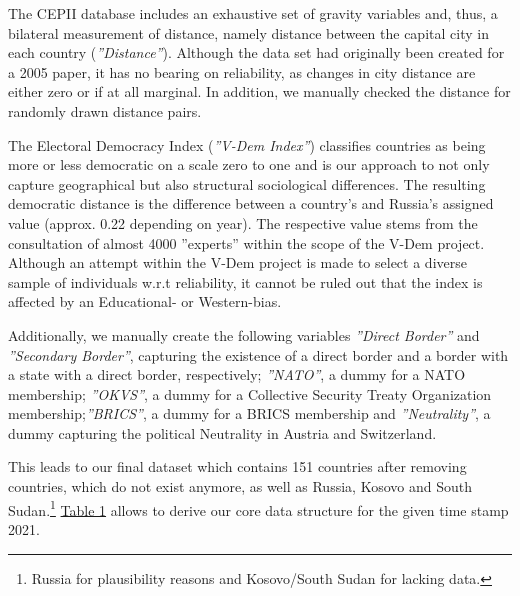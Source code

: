 \documentclass[12pt,a4paper]{article}
\begin{document}
\pagebreak
The CEPII database includes an exhaustive set of gravity variables and, thus, a bilateral measurement of distance, namely distance between the capital city in each country (\textit{''Distance''}). Although the data set had originally been created for a 2005 paper, it has no bearing on reliability, as changes in city distance are either zero or if at all marginal. In addition, we manually checked the distance for randomly drawn distance pairs.

The Electoral Democracy Index (\textit{''V-Dem Index''}) classifies countries as being more or less democratic  on a scale zero to one and is our approach to not only capture geographical but also structural sociological differences. The resulting democratic distance is the difference between a country's and Russia's assigned value (approx. 0.22 depending on year). The respective value stems from the consultation of almost 4000 ''experts'' within the scope of the V-Dem project. Although an attempt within the V-Dem project is made to select a diverse sample of individuals w.r.t reliability, it cannot be ruled out that the index is affected by an Educational- or Western-bias.

Additionally, we manually create the following variables \textit{''Direct Border''} and \textit{''Secondary Border''}, capturing the existence of a direct border and a border with a state with a direct border, respectively; \textit{''NATO''}, a dummy for a NATO membership; \textit{''OKVS''}, a dummy for a Collective Security Treaty Organization membership;\textit{''BRICS''}, a dummy for a BRICS membership and \textit{''Neutrality''}, a dummy capturing the political Neutrality in Austria and Switzerland. 


This leads to our final dataset which contains 151 countries after removing countries, which do not exist anymore, as well as Russia, Kosovo and South Sudan.\footnote{Russia for plausibility reasons	and Kosovo/South Sudan for lacking data.} \hyperref[t:1]{\color{blue} Table 1} allows to derive our core data structure for the given time stamp 2021.
\end{document}
